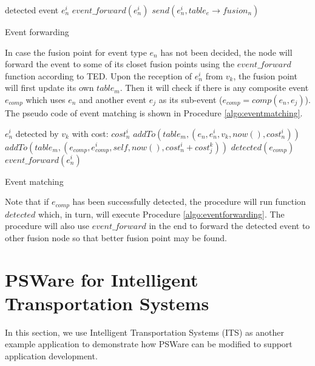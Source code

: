 \begin{algorithm}
\begin{algorithmic}
\REQUIRE detected event \(e_n^i\)
		\STATE \(event\_forward(e_n^i)\)
	\ELSE
		\STATE \(send(e_n^i, table_e\rightarrow fusion_n)\)
	\ENDIF
\end{algorithmic}
\caption{Event forwarding}
\label{algo:eventforwarding}
\end{algorithm}

In case the fusion point for event type \(e_n\) has not been decided, the node will forward the event to some of its closet fusion points using the \(event\_forward\) function according to TED. Upon the reception of \(e_n^i\) from \(v_k\), the fusion point will first update its own \(table_m\). Then it will check if there is any composite event \(e_{comp}\) which uses \(e_n\) and another event \(e_j\) as its sub-event (\(e_{comp}=comp(e_n, e_j)\)). The pseudo code of event matching is shown in Procedure \ref{algo:eventmatching}.

\begin{algorithm}
\begin{algorithmic}
\REQUIRE \(e_n^i\) detected by \(v_k\) with cost: \(cost_n^i\)
	\STATE \(addTo(table_m, (e_n, e_n^i, v_k, now(), cost_n^i))\)
					\STATE \(addTo(table_m, (e_{comp}, e_{comp}^i, self, now(), cost_n^i+cost_j^k))\)
					\STATE \(detected(e_{comp})\)
				\ENDIF
			\ENDFOR
		\ENDIF
	\ENDFOR
	\STATE \(event\_forward(e_n^i)\)
\end{algorithmic}
\caption{Event matching}
\label{algo:eventmatching}
\end{algorithm}

Note that if \(e_{comp}\) has been successfully detected, the procedure will run function \(detected\) which, in turn, will execute Procedure \ref{algo:eventforwarding}. The procedure will also use \(event\_forward\) in the end to forward the detected event to other fusion node so that better fusion point may be found.

\section{PSWare for Intelligent Transportation Systems}
In this section, we use Intelligent Transportation Systems (ITS) as another example application to demonstrate how PSWare can be modified to support application development.


